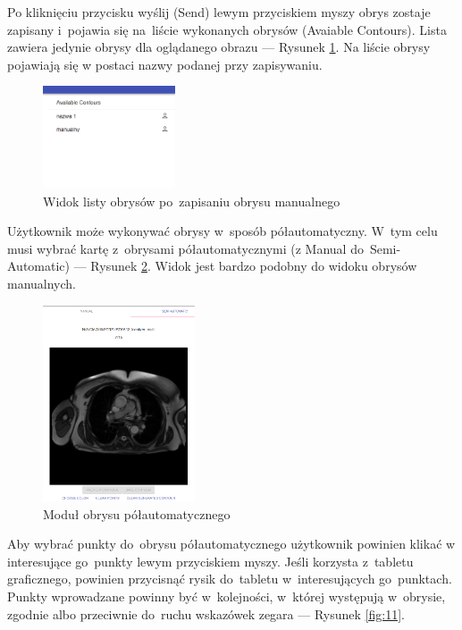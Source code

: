\documentclass[a4paper,11pt,twoside,openright]{report}
\theoremstyle{definition}
\begin{document}
Po kliknięciu przycisku wyślij (Send) lewym przyciskiem myszy obrys zostaje
zapisany i~pojawia się na~liście wykonanych obrysów (Avaiable Contours). Lista
zawiera jedynie obrysy dla oglądanego obrazu --- Rysunek \ref{fig:9}. Na liście
obrysy pojawiają się w postaci nazwy podanej przy zapisywaniu.

\begin{figure}[h!]
	\center
	\includegraphics[width=0.35\textwidth]{9}
	\caption{Widok listy obrysów po~zapisaniu obrysu manualnego}
    	\label{fig:9}
\end{figure}

Użytkownik może wykonywać obrysy w~sposób półautomatyczny. W~tym celu musi
wybrać kartę z~obrysami półautomatycznymi (z Manual do~Semi-Automatic) ---
Rysunek \ref{fig:10}. Widok jest bardzo podobny do widoku obrysów manualnych.

\pagebreak

\begin{figure}[h!]
	\center
	\includegraphics[width=0.4\textwidth]{10}
	\caption{Moduł obrysu półautomatycznego}
    	\label{fig:10}
\end{figure}

Aby wybrać punkty do~obrysu półautomatycznego użytkownik powinien klikać w
interesujące go~punkty lewym przyciskiem myszy. Jeśli korzysta z~tabletu
graficznego, powinien przycisnąć rysik do~tabletu w~interesujących go~punktach.
Punkty wprowadzane powinny być w~kolejności, w~której występują w~obrysie,
zgodnie albo przeciwnie do~ruchu wskazówek zegara --- Rysunek \ref{fig:11}.
\end{document}
